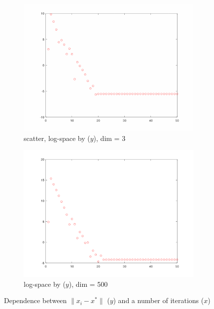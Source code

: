 \documentclass{article}
\begin{document}
\begin{figure}[H]
\centering
\begin{subfigure}{.5\textwidth}
  \centering
  \includegraphics[width=.8\linewidth]{par_conv_3.png}
  \caption{scatter, log-space by (\(y\)), dim = 3}
  \label{fig:sub12}
\end{subfigure}%
\begin{subfigure}{.5\textwidth}
  \centering
  \includegraphics[width=.8\linewidth]{par_conv_500.png}
  \caption{log-space by (\(y\)), dim = 500}
  \label{fig:sub22}
\end{subfigure}
\caption{Dependence between \(\|x_i - x^*\|\) (\(y\)) and a number of iterations (\(x\))}
\label{fig:test2}
\end{figure}
\end{document}
